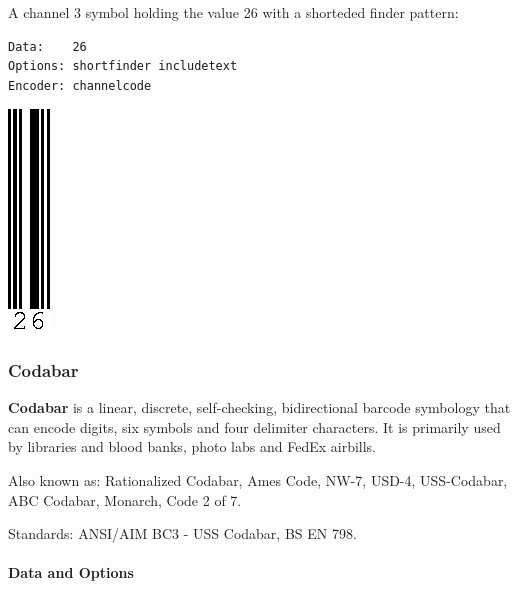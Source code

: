 A channel 3 symbol holding the value 26 with a shorteded finder pattern:

\begin{verbatim}
Data:    26
Options: shortfinder includetext
Encoder: channelcode
\end{verbatim}

\includegraphics{images/channelcode-4.eps}

\hypertarget{codabar}{%
\subsubsection{Codabar}\label{codabar}}

\textbf{Codabar} is a linear, discrete, self-checking, bidirectional
barcode symbology that can encode digits, six symbols and four delimiter
characters. It is primarily used by libraries and blood banks, photo
labs and FedEx airbills.

Also known as: Rationalized Codabar, Ames Code, NW-7, USD-4,
USS-Codabar, ABC Codabar, Monarch, Code 2 of 7.

Standards: ANSI/AIM BC3 - USS Codabar, BS EN 798.

\hypertarget{data-and-options-61}{%
\paragraph{Data and Options}\label{data-and-options-61}}

